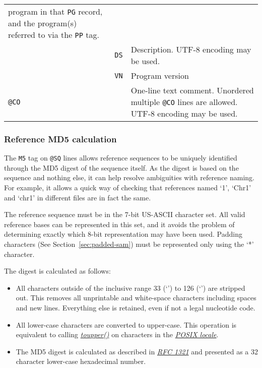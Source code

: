 \documentclass[10pt]{article}
\begin{document}
\begin{center}
\begin{longtable}{|l|l|p{13.5cm}|}
        program in that {\tt PG} record, and the program(s) referred to via the {\tt PP} tag. \\\cline{2-3}
  & {\tt DS} & Description.  UTF-8 encoding may be used.\\\cline{2-3}
  & {\tt VN} & Program version \\\cline{1-3}
  \multicolumn{2}{|l}{\tt @CO} & One-line text comment. Unordered multiple {\tt @CO} lines are allowed. UTF-8 encoding may be used.\\
  \cline{1-3}
\end{longtable}
\end{center}

\subsubsection{Reference MD5 calculation}\label{sec:ref-md5}
The {\tt M5} tag on {\tt @SQ} lines allows reference sequences to be uniquely identified through the MD5 digest of the sequence itself.
As the digest is based on the sequence and nothing else, it can help resolve ambiguities with reference naming.
For example, it allows a quick way of checking that references named `1', `Chr1' and `chr1' in different files are in fact the same.

The reference sequence must be in the 7-bit US-ASCII character set.
All valid reference bases can be represented in this set, and it avoids the problem of determining exactly which 8-bit representation may have been used.
Padding characters (See Section~\ref{sec:padded-sam}) must be represented only using the `*' character. 

The digest is calculated as follows:
\begin{itemize}
\item All characters outside of the inclusive range 33 (`') to 126 (`') are stripped out.
This removes all unprintable and white-space characters including spaces and new lines.
Everything else is retained, even if not a legal nucleotide code.
\item All lower-case characters are converted to upper-case.
This operation is equivalent to calling \href{http://pubs.opengroup.org/onlinepubs/9699919799/functions/toupper.html}{\sl toupper()} on characters in the \href{http://pubs.opengroup.org/onlinepubs/9699919799/basedefs/V1\_chap07.html\#tag\_07\_02}{\sl POSIX locale}.
\item The MD5 digest is calculated as described in \href{https://tools.ietf.org/html/rfc1321}{\sl RFC 1321} and presented as a 32 character lower-case hexadecimal number.
\end{itemize}
\end{document}
